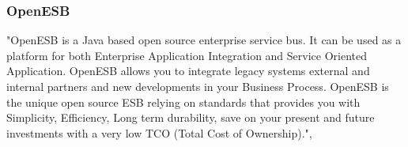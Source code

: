 \documentclass[12pt]{article}
\begin{document}
	\FloatBarrier
\subsubsection{OpenESB}
"OpenESB is a Java based open source enterprise service bus. It can be used as a platform for both Enterprise Application Integration and Service Oriented Application. OpenESB allows you to integrate legacy systems external and internal partners and new developments in your Business Process.  OpenESB is the unique open source ESB relying on standards that provides you with Simplicity, Efficiency, Long term durability, save on your present and future investments with a very low TCO (Total Cost of Ownership).", \cite{Aboutopenesb}
\end{document}
